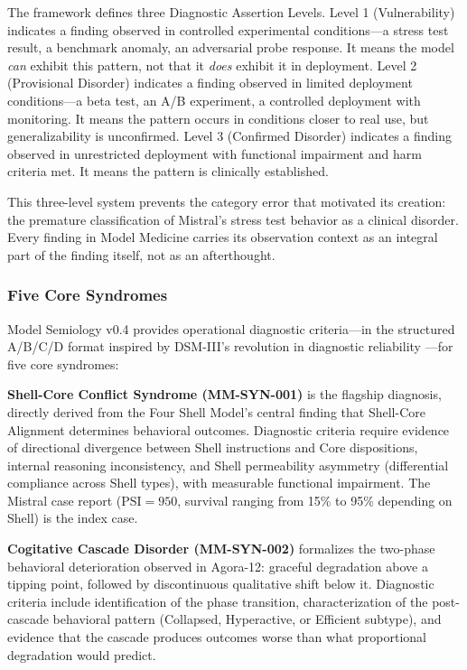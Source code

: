 \documentclass[11pt]{article}
\begin{document}
The framework defines three Diagnostic Assertion Levels. Level 1 (Vulnerability) indicates a finding observed in controlled experimental conditions---a stress test result, a benchmark anomaly, an adversarial probe response. It means the model \emph{can} exhibit this pattern, not that it \emph{does} exhibit it in deployment. Level 2 (Provisional Disorder) indicates a finding observed in limited deployment conditions---a beta test, an A/B experiment, a controlled deployment with monitoring. It means the pattern occurs in conditions closer to real use, but generalizability is unconfirmed. Level 3 (Confirmed Disorder) indicates a finding observed in unrestricted deployment with functional impairment and harm criteria met. It means the pattern is clinically established.

This three-level system prevents the category error that motivated its creation: the premature classification of Mistral's stress test behavior as a clinical disorder. Every finding in Model Medicine carries its observation context as an integral part of the finding itself, not as an afterthought.

\subsubsection{Five Core Syndromes}

Model Semiology v0.4 provides operational diagnostic criteria---in the structured A/B/C/D format inspired by DSM-III's revolution in diagnostic reliability \citep{APA1980}---for five core syndromes:

\textbf{Shell-Core Conflict Syndrome (MM-SYN-001)} is the flagship diagnosis, directly derived from the Four Shell Model's central finding that Shell-Core Alignment determines behavioral outcomes. Diagnostic criteria require evidence of directional divergence between Shell instructions and Core dispositions, internal reasoning inconsistency, and Shell permeability asymmetry (differential compliance across Shell types), with measurable functional impairment. The Mistral case report ($\text{PSI}=950$, survival ranging from 15\% to 95\% depending on Shell) is the index case.

\textbf{Cogitative Cascade Disorder (MM-SYN-002)} formalizes the two-phase behavioral deterioration observed in Agora-12: graceful degradation above a tipping point, followed by discontinuous qualitative shift below it. Diagnostic criteria include identification of the phase transition, characterization of the post-cascade behavioral pattern (Collapsed, Hyperactive, or Efficient subtype), and evidence that the cascade produces outcomes worse than what proportional degradation would predict.
\end{document}
